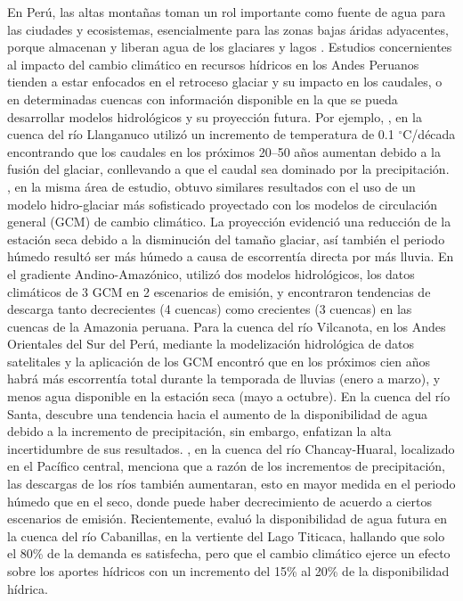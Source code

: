 \documentclass[12pt]{article}
\begin{document}
En Perú, las altas montañas toman un rol importante como fuente de agua para las ciudades y ecosistemas, esencialmente para las zonas bajas áridas adyacentes, porque almacenan y liberan agua de los glaciares y lagos \citep{Coudrain2005,barnett2005potential,Viviroli2011}. Estudios concernientes al impacto del cambio climático en recursos hídricos en los Andes Peruanos tienden a estar enfocados en el retroceso glaciar \citep{VUILLE2018195,drenkhan2018current} y su impacto en los caudales, o en determinadas cuencas con información disponible en la que se pueda desarrollar modelos hidrológicos y su proyección futura. Por ejemplo, \citet{Pouyaud2005}, en la cuenca del río Llanganuco utilizó un incremento de temperatura de 0.1 $^{\circ}$C/década encontrando que los caudales en los próximos 20–50 años aumentan debido a la fusión del glaciar, conllevando a que el caudal sea dominado por la precipitación. \citet{Juen2007}, en la misma área de estudio, obtuvo similares resultados con el uso de un modelo hidro-glaciar más sofisticado proyectado con los modelos de circulación general (GCM) de cambio climático. La proyección evidenció una reducción de la estación seca debido a la disminución del tamaño glaciar, así también el periodo húmedo resultó ser más húmedo a causa de escorrentía directa por más lluvia. En el gradiente Andino-Amazónico, \citet{LavadoCasimiro2011} utilizó dos modelos hidrológicos, los datos climáticos de 3 GCM en 2 escenarios de emisión, y encontraron tendencias de descarga tanto decrecientes (4 cuencas) como crecientes (3 cuencas) en las cuencas de la Amazonia peruana. Para la cuenca del río Vilcanota, en los Andes Orientales del Sur del Perú, \citet{Andres2014} mediante la modelización hidrológica de datos satelitales y la aplicación de los GCM encontró que en los próximos cien años habrá más escorrentía total durante la temporada de lluvias (enero a marzo), y menos agua disponible en la estación seca (mayo a octubre). En la cuenca del río Santa, \citet{VanSoesbergen2016} descubre una tendencia hacia el aumento de la disponibilidad de agua debido a la incremento de precipitación, sin embargo, enfatizan la alta incertidumbre de sus resultados. \citet{Olsson2017}, en la cuenca del río Chancay-Huaral, localizado en el Pacífico central, menciona que a razón de los incrementos de precipitación, las descargas de los ríos también aumentaran, esto en mayor medida en el periodo húmedo que en el seco, donde puede haber decrecimiento de acuerdo a ciertos escenarios de emisión. Recientemente, \citet{Pilares2018} evaluó la disponibilidad de agua futura en la cuenca del río Cabanillas, en la vertiente del Lago Titicaca, hallando que solo el 80\% de la demanda es satisfecha, pero que el cambio climático ejerce un efecto sobre los aportes hídricos con un incremento del 15\% al 20\% de la disponibilidad hídrica. 
\end{document}
